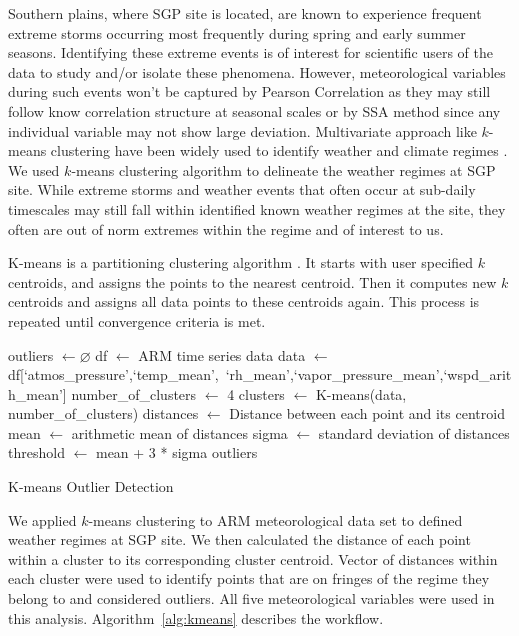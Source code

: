 Southern plains, where SGP site is located, are known to experience frequent extreme
storms occurring most frequently during spring and early summer seasons.
Identifying these extreme events is of interest for scientific users of
the data to study and/or isolate these phenomena. However,
meteorological variables during such events won't be captured by Pearson
Correlation as they may still follow know correlation structure at seasonal scales
or by SSA method since any individual variable may not
show large deviation. Multivariate approach like $k$-means clustering
have been widely used to identify weather and climate regimes
\cite{Hoffman_EI_20050803,Hargrove_EnvironManage_20040401}. We used
$k$-means clustering algorithm to delineate the weather regimes at SGP
site. While extreme storms and weather events that often occur at sub-daily
timescales may still fall within identified known weather regimes at the
site, they often are out of norm extremes within the regime and of
interest to us.

K-means is a partitioning clustering algorithm \cite{macqueen1967some,
hartigan1979algorithm}. It starts with user specified $k$ centroids, 
and assigns the points to the nearest centroid. Then it
computes new $k$ centroids and assigns all data points to these
centroids again. This process is repeated until convergence criteria is
met. 

\begin{algorithm}[ht]
\DontPrintSemicolon
\SetAlgoLined
\BlankLine

outliers $\leftarrow \varnothing$\;
df $\leftarrow$ ARM time series data\;
data $\leftarrow$ df[`atmos\_pressure',`temp\_mean',\
`rh\_mean',`vapor\_pressure\_mean',`wspd\_arith\_mean']\;
number\_of\_clusters $\leftarrow$ 4\;
clusters $\leftarrow$ K-means(data, number\_of\_clusters)\;
distances $\leftarrow$ Distance between each point and its centroid\;
mean $\leftarrow$ arithmetic mean of distances\;
sigma $\leftarrow$ standard deviation of distances\;
threshold $\leftarrow$ mean + 3 * sigma\;
\Return outliers
\caption{K-means Outlier Detection}\label{alg:kmeans}
\end{algorithm}

We applied $k$-means clustering to ARM meteorological data set to
defined weather regimes at SGP site. We then calculated the distance of
each point within a cluster to its corresponding cluster centroid.
Vector of distances within each cluster were used to identify points
that are on fringes of the regime they belong to and considered
outliers. All five meteorological variables were used in this analysis.
Algorithm~\ref{alg:kmeans} describes the workflow.

